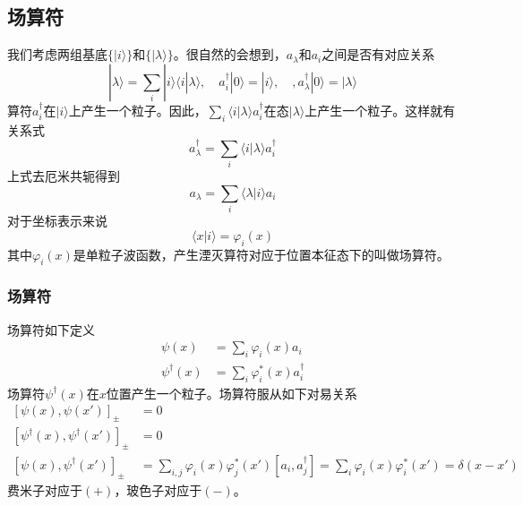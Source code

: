 \documentclass[12pt]{article}
\begin{document}
\subsection{场算符}
我们考虑两组基底$\{|i\rangle\}$和$\{|\lambda\rangle\}$。很自然的会想到，$a_\lambda$和$a_i$之间是否有对应关系
\begin{equation*}
    |\lambda\rangle=\sum_{i}|i\rangle\langle i|\lambda\rangle,\quad a_i^\dagger|0\rangle=|i\rangle,\quad,a_\lambda^\dagger|0\rangle=|\lambda\rangle
\end{equation*}
算符$a_i^\dagger$在$|i\rangle$上产生一个粒子。因此，$\sum_{i}\langle i|\lambda\rangle a_i^\dagger$在态$|\lambda\rangle$上产生一个粒子。这样就有关系式
\begin{equation*}
    a_\lambda^\dagger=\sum_{i}\langle i|\lambda\rangle a_i^\dagger
\end{equation*}
上式去厄米共轭得到
\begin{equation*}
    a_\lambda=\sum_{i}\langle\lambda|i\rangle a_i
\end{equation*}
对于坐标表示来说
\begin{equation*}
    \langle x|i\rangle=\varphi_i(x)
\end{equation*}
其中$\varphi_i(x)$是单粒子波函数，产生湮灭算符对应于位置本征态下的叫做场算符。
\subsubsection{场算符}
场算符如下定义
\begin{equation*}
    \begin{split}
        \psi(x)&=\sum_{i}\varphi_i(x)a_i\\
        \psi^\dagger(x)&=\sum_{i}\varphi_i^*(x)a_i^\dagger
    \end{split}
\end{equation*}
场算符$\psi^\dagger(x)$在$x$位置产生一个粒子。场算符服从如下对易关系
\begin{equation*}
    \begin{split}
        [\psi(x),\psi(x')]_{\pm}&=0\\
        [\psi^\dagger(x),\psi^\dagger(x')]_{\pm}&=0\\
        [\psi(x),\psi^\dagger(x')]_{\pm}&=\sum_{i,j}\varphi_i(x)\varphi_j^*(x')[a_i,a_j^\dagger]=\sum_{i}\varphi_i(x)\varphi_i^*(x')=\delta(x-x')
    \end{split}
\end{equation*}
费米子对应于$(+)$，玻色子对应于$(-)$。
\end{document}
